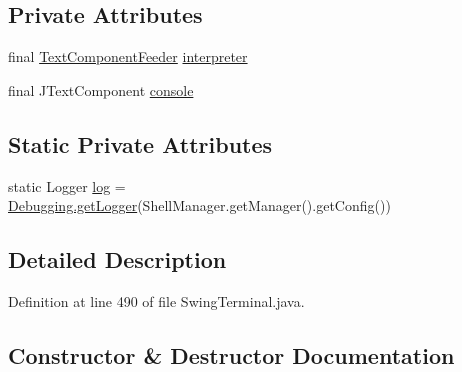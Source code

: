 \subsection*{Private Attributes}
\begin{DoxyCompactItemize}
\item 
final \hyperlink{classgov_1_1nasa_1_1jpf_1_1inspector_1_1frontends_1_1jpfshell_1_1gui_1_1_text_component_feeder}{Text\+Component\+Feeder} \hyperlink{classgov_1_1nasa_1_1jpf_1_1inspector_1_1frontends_1_1jpfshell_1_1gui_1_1_swing_terminal_1_1_j_line_simple_output_stream_a3636ed20e49d89d6ea294e2a6d5fba25}{interpreter}
\item 
final J\+Text\+Component \hyperlink{classgov_1_1nasa_1_1jpf_1_1inspector_1_1frontends_1_1jpfshell_1_1gui_1_1_swing_terminal_1_1_j_line_simple_output_stream_ac4b63d3fccd27d08c046543b95ff50c1}{console}
\end{DoxyCompactItemize}
\subsection*{Static Private Attributes}
\begin{DoxyCompactItemize}
\item 
static Logger \hyperlink{classgov_1_1nasa_1_1jpf_1_1inspector_1_1frontends_1_1jpfshell_1_1gui_1_1_swing_terminal_1_1_j_line_simple_output_stream_ab1442dd9013dc82d6479a58314961445}{log} = \hyperlink{classgov_1_1nasa_1_1jpf_1_1inspector_1_1utils_1_1_debugging_a06cdc92a97816ad85793b034bfd5822a}{Debugging.\+get\+Logger}(Shell\+Manager.\+get\+Manager().get\+Config())
\end{DoxyCompactItemize}


\subsection{Detailed Description}


Definition at line 490 of file Swing\+Terminal.\+java.



\subsection{Constructor \& Destructor Documentation}
